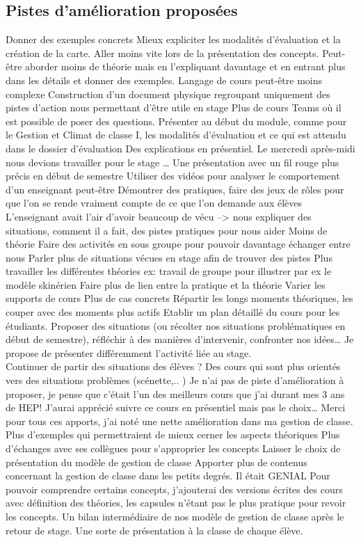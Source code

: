 \documentclass[
  french,
]{article}
\begin{document}
\hypertarget{pistes-damuxe9lioration-proposuxe9es}{%
\subsection{Pistes d'amélioration proposées}\label{pistes-damuxe9lioration-proposuxe9es}}

Donner des exemples concrets
Mieux expliciter les modalités d'évaluation et la création de la carte. Aller moins vite lors de la présentation des concepts. Peut-être aborder moins de théorie mais en l'expliquant davantage et en entrant plus dans les détails et donner des exemples.
Langage de cours peut-être moins complexe
Construction d'un document physique regroupant uniquement des pistes d'action nous permettant d'être utile en stage
Plus de cours Teams où il est possible de poser des questions.
Présenter au début du module, comme pour le Gestion et Climat de classe I, les modalités d'évaluation et ce qui est attendu dans le dossier d'évaluation
Des explications en présentiel. Le mercredi après-midi nous devions travailler pour le stage \ldots{}
Une présentation avec un fil rouge plus précis en début de semestre
Utiliser des vidéos pour analyser le comportement d'un enseignant peut-être
Démontrer des pratiques, faire des jeux de rôles pour que l'on se rende vraiment compte de ce que l'on demande aux élèves
L'enseignant avait l'air d'avoir beaucoup de vécu --\textgreater{} nous expliquer des situations, comment il a fait, des pistes pratiques pour nous aider
Moins de théorie
Faire des activités en sous groupe pour pouvoir davantage échanger entre nous
Parler plus de situations vécues en stage afin de trouver des pistes
Plus travailler les différentes théories ex: travail de groupe pour illustrer par ex le modèle skinérien
Faire plus de lien entre la pratique et la théorie
Varier les supports de cours
Plus de cas concrets
Répartir les longs moments théoriques, les couper avec des moments plus actifs
Etablir un plan détaillé du cours pour les étudiants.
Proposer des situations (ou récolter nos situations problématiques en début de semestre), réfléchir à des manières d'intervenir, confronter nos idées\ldots{}
Je propose de présenter différemment l'activité liée au stage.\\
Continuer de partir des situations des élèves ?
Des cours qui sont plus orientés vers des situations problèmes (scénette,.. )
Je n'ai pas de piste d'amélioration à proposer, je pense que c'était l'un des meilleurs cours que j'ai durant mes 3 ans de HEP! J'aurai apprécié suivre ce cours en présentiel mais pas le choix\ldots{} Merci pour tous ces apports, j'ai noté une nette amélioration dans ma gestion de classe.
Plus d'exemples qui permettraient de mieux cerner les aspects théoriques
Plus d'échanges avec ses collègues pour s'approprier les concepts
Laisser le choix de présentation du modèle de gestion de classe
Apporter plus de contenus concernant la gestion de classe dans les petits degrés.
Il était GENIAL
Pour pouvoir comprendre certains concepts, j'ajouterai des versions écrites des cours avec définition des théories, les capsules n'étant pas le plus pratique pour revoir les concepts.
Un bilan intermédiaire de nos modèle de gestion de classe après le retour de stage. Une sorte de présentation à la classe de chaque élève.
\end{document}
